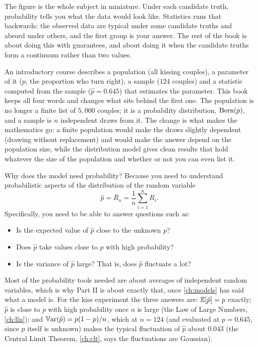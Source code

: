 The figure is the whole subject in miniature.
Under each candidate truth, probability tells you what the data would look like.
Statistics runs that backwards: the observed data are typical under some candidate truths and absurd under others, and the first group is your answer.
The rest of the book is about doing this with guarantees, and about doing it when the candidate truths form a continuum rather than two values.

\begin{bridge}
An introductory course describes a population (all kissing couples), a parameter of it ($p$, the proportion who turn right), a sample ($124$ couples) and a statistic computed from the sample ($\hat{p} = 0.645$) that estimates the parameter.
This book keeps all four words and changes what sits behind the first one.
The population is no longer a finite list of $5{,}000$ couples; it is a probability distribution, $\text{Bern}(p)$, and a sample is $n$ independent draws from it.
The change is what makes the mathematics go: a finite population would make the draws slightly dependent (drawing without replacement) and would make the answer depend on the population size, while the distribution model gives clean results that hold whatever the size of the population and whether or not you can even list it.
\end{bridge}

Why does the model need probability?
Because you need to understand probabilistic aspects of the distribution of the random variable
\[
\hat{p} = \bar{R}_n = \frac{1}{n} \sum_{i=1}^n R_i.
\]
Specifically, you need to be able to answer questions such as:
\begin{itemize}[nosep]
\item Is the expected value of $\hat{p}$ close to the unknown $p$?
\item Does $\hat{p}$ take values close to $p$ with high probability?
\item Is the variance of $\hat{p}$ large? That is, does $\hat{p}$ fluctuate a lot?
\end{itemize}
Most of the probability tools needed are about averages of independent random variables, which is why Part II is about exactly that, once \cref{ch:models} has said what a model is.
For the kiss experiment the three answers are: $\operatorname*{\mathbb{E}}[\hat{p}] = p$ exactly; $\hat{p}$ is close to $p$ with high probability once $n$ is large (the Law of Large Numbers, \cref{ch:lln}); and $\operatorname*{\mathbb{V}\text{ar}}(\hat{p}) = p(1-p)/n$, which at $n = 124$ (and evaluated at $p = 0.645$, since $p$ itself is unknown) makes the typical fluctuation of $\hat{p}$ about $0.043$ (the Central Limit Theorem, \cref{ch:clt}, says the fluctuations are Gaussian).

